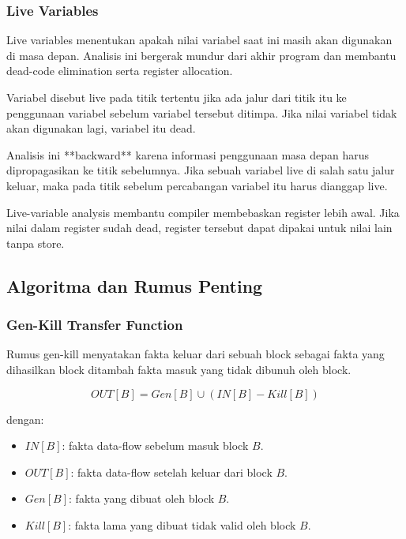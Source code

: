 \subsubsection{Live Variables}

\begin{jawab}
Live variables menentukan apakah nilai variabel saat ini masih akan digunakan di masa depan. Analisis ini bergerak mundur dari akhir program dan membantu dead-code elimination serta register allocation.
\end{jawab}

Variabel disebut live pada titik tertentu jika ada jalur dari titik itu ke penggunaan variabel sebelum variabel tersebut ditimpa. Jika nilai variabel tidak akan digunakan lagi, variabel itu dead.

Analisis ini **backward** karena informasi penggunaan masa depan harus dipropagasikan ke titik sebelumnya. Jika sebuah variabel live di salah satu jalur keluar, maka pada titik sebelum percabangan variabel itu harus dianggap live.

Live-variable analysis membantu compiler membebaskan register lebih awal. Jika nilai dalam register sudah dead, register tersebut dapat dipakai untuk nilai lain tanpa store.

\subsection{Algoritma dan Rumus Penting}

\subsubsection{Gen-Kill Transfer Function}

\begin{jawab}
Rumus gen-kill menyatakan fakta keluar dari sebuah block sebagai fakta yang dihasilkan block ditambah fakta masuk yang tidak dibunuh oleh block.
\end{jawab}

\begin{equation}
    OUT[B]=Gen[B]\cup(IN[B]-Kill[B])
    \label{eq:gen-kill}
\end{equation}

dengan:
\begin{itemize}
    \item $IN[B]$: fakta data-flow sebelum masuk block $B$.
    \item $OUT[B]$: fakta data-flow setelah keluar dari block $B$.
    \item $Gen[B]$: fakta yang dibuat oleh block $B$.
    \item $Kill[B]$: fakta lama yang dibuat tidak valid oleh block $B$.
\end{itemize}

